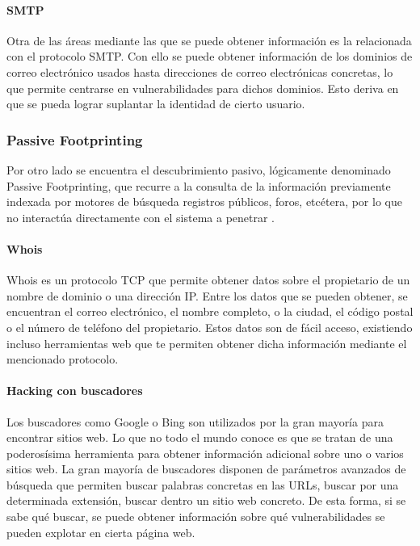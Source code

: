 \paragraph{SMTP}

Otra de las áreas mediante las que se puede obtener información es la relacionada con el protocolo SMTP. Con ello se puede obtener información de los dominios de correo electrónico usados hasta direcciones de correo electrónicas concretas, lo que permite centrarse en vulnerabilidades para dichos dominios. Esto deriva en que se pueda lograr suplantar la identidad de cierto usuario.

\subsubsection{Passive Footprinting}

Por otro lado se encuentra el descubrimiento pasivo, lógicamente denominado Passive Footprinting, que recurre a la consulta de la información previamente indexada por motores de búsqueda registros públicos, foros, etcétera, por lo que no interactúa directamente con el sistema a penetrar \cite{pentesting-kali}. 

\paragraph{Whois}

Whois es un protocolo TCP que permite obtener datos sobre el propietario de un nombre de dominio o una dirección IP. Entre los datos que se pueden obtener, se encuentran el correo electrónico, el nombre completo, o la ciudad, el código postal o el número de teléfono del propietario. Estos datos son de fácil acceso, existiendo incluso herramientas web que te permiten obtener dicha información mediante el mencionado protocolo.

\paragraph{Hacking con buscadores}

Los buscadores como Google o Bing son utilizados por la gran mayoría para encontrar sitios web. Lo que no todo el mundo conoce es que se tratan de una poderosísima herramienta para obtener información adicional sobre uno o varios sitios web. La gran mayoría de buscadores disponen de parámetros avanzados de búsqueda que permiten buscar palabras concretas en las URLs, buscar por una determinada extensión, buscar dentro un sitio web concreto. De esta forma, si se sabe qué buscar, se puede obtener información sobre qué vulnerabilidades se pueden explotar en cierta página web.

